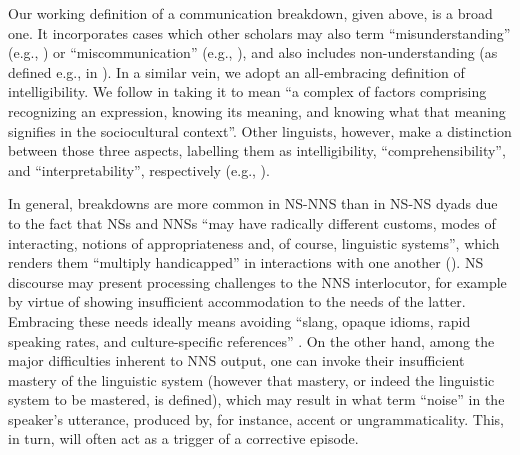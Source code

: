 \documentclass[output=paper,colorlinks,citecolor=brown,modfonts,nonflat]{../langscibook}
\begin{document}
Our working definition of a communication breakdown, given above, is a broad one. It incorporates cases which other scholars may also term “misunderstanding” (e.g., \citealt{Mauranen2006}) or “miscommunication” (e.g., \citealt{Dascal1999}), and also includes non-understanding (as defined e.g., in \citealt{Jenkins2000}). In a similar vein, we adopt an all-embracing definition of intelligibility. We follow \citet[11]{Bamgbose1998} in taking it to mean “a complex of factors comprising recognizing an expression, knowing its meaning, and knowing what that meaning signifies in the sociocultural context”. Other linguists, however, make a distinction between those three aspects, labelling them as intelligibility, “comprehensibility”, and “interpretability”, respectively (e.g., \citealt{SmithNelson1985, McKay2002}).


In general, breakdowns are more common in NS-NNS than in NS-NS dyads due to the fact that NSs and NNSs “may have radically different customs, modes of interacting, notions of appropriateness and, of course, linguistic systems”, which renders them “multiply handicapped” in interactions with one another (\citealt[327, 340]{VaronisGass1985}). NS discourse may present processing challenges to the NNS interlocutor, for example by virtue of showing insufficient accommodation to the needs of the latter. Embracing these needs ideally means avoiding “slang, opaque idioms, rapid speaking rates, and culture-specific references” \citep[82]{Trudgill2005}. On the other hand, among the major difficulties inherent to NNS output, one can invoke their insufficient mastery of the linguistic system (however that mastery, or indeed the linguistic system to be mastered, is defined), which may result in what \citet[334]{VaronisGass1985} term “noise” in the speaker’s utterance, produced by, for instance, accent or ungrammaticality. This, in turn, will often act as a trigger of a corrective episode. 
\end{document}
